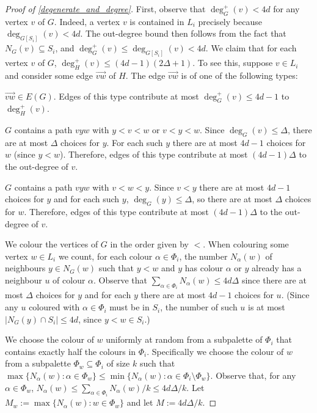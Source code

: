 \documentclass{patmorin}
\begin{document}
\begin{proof}[Proof of \cref{degenerate_and_degree}]
  First, observe that $\deg^+_G(v)< 4d$ for any vertex $v$ of $G$. Indeed, a vertex $v$ is contained in $L_i$ precisely because $\deg_{G[S_i]}(v)<4d$.  The out-degree bound then follows from the fact that $N_{G}(v)\subseteq S_i$, and $\deg^+_{G}(v)\le\deg_{G[S_i]}(v)<4d$.  We claim that for each vertex $v$ of $G$, $\deg^+_{H}(v)\le (4d-1)(2\Delta+1)$.  To see this, suppose $v\in L_i$ and consider some edge $\overrightarrow{vw}$ of $H$.  The edge  $\overrightarrow{vw}$ is of one of the following types:
  \begin{compactenum}[(T1)]
    \item $\overrightarrow{vw}\in E(G)$. Edges of this type contribute at most $\deg^+_{G}(v)\le 4d-1$ to $\deg^+_{H}(v)$.
    \item $G$ contains a path $vyw$ with $y < v < w$ or $v < y < w$.  Since $\deg_G(v)\le\Delta$, there are at most $\Delta$ choices for $y$.  For each such $y$ there are at most $4d-1$ choices for $w$ (since $y<w$).  Therefore, edges of this type contribute at most $(4d-1)\Delta$ to the out-degree of $v$.
    \item $G$ contains a path $vyw$ with $v < w < y$.  Since $v<y$ there are at most $4d-1$ choices for $y$ and for each such $y$, $\deg_G(y)\le\Delta$, so there are at most $\Delta$ choices for $w$.  Therefore, edges of this type contribute at most $(4d-1)\Delta$ to the out-degree of $v$.
  \end{compactenum}
  We colour the vertices of $G$ in the order given by $<$.  When colouring some vertex $w\in L_i$ we count, for each colour $\alpha\in \Phi_i$, the number $N_\alpha(w)$ of neighbours $y\in N_G(w)$ such that $y < w$ and $y$ has colour $\alpha$ or $y$ already has a neighbour $u$ of colour $\alpha$. Observe that $\sum_{\alpha\in \Phi_i} N_\alpha(w)\le 4d\Delta$ since there are at most $\Delta$ choices for $y$ and for each $y$ there are at most $4d-1$ choices for $u$.  (Since any $u$ coloured with $\alpha\in\Phi_i$ must be in $S_i$, the number of such $u$ is at most $|N_G(y)\cap S_i|\le 4d$, since $y < w\in S_i$.)

  We choose the colour of $w$ uniformly at random from a subpalette of $\Phi_i$ that contains exactly half the colours in $\Phi_i$.  Specifically we choose the colour of $w$ from a subpalette $\Phi_w\subseteq \Phi_i$ of size $k$ such that $\max\{N_\alpha(w):\alpha\in \Phi_w\}\le\min\{N_\alpha(w):\alpha\in\Phi_i\setminus\Phi_w\}$.  Observe that, for any $\alpha\in\Phi_w$, $N_\alpha(w)\le \sum_{\alpha\in\Phi_i} N_\alpha(w)/k \le 4d\Delta/k$. Let $M_w:=\max\{N_\alpha(w):w\in\Phi_w\}$ and let $M:=4d\Delta/k$.


\end{proof}
\end{document}
